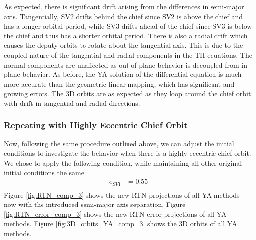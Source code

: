 As expected, there is significant drift arising from the differences in semi-major axis. Tangentially, SV2 drifts behind the chief since SV2 is above the chief and has a longer orbital period, while SV3 drifts ahead of the chief since SV3 is below the chief and thus has a shorter orbital period. There is also a radial drift which causes the deputy orbits to rotate about the tangential axis. This is due to the coupled nature of the tangential and radial components in the TH equations. The normal components are unaffected as out-of-plane behavior is decoupled from in-plane behavior. As before, the YA solution of the differential equation is much more accurate than the geometric linear mapping, which has significant and growing errors. The 3D orbits are as expected as they loop around the chief orbit with drift in tangential and radial directions.

\subsubsection{Repeating with Highly Eccentric Chief Orbit}
Now, following the same procedure outlined above, we can adjust the initial conditions to investigate the behavior when there is a highly eccentric chief orbit. We chose to apply the following condition, while maintaining all other original initial conditions the same. 
\begin{align*}
e_{SV1} &= 0.55 \\
\end{align*}
Figure \ref{fig:RTN_comp_3} shows the new RTN projections of all YA methods now with the introduced semi-major axis separation. Figure \ref{fig:RTN_error_comp_3} shows the new RTN error projections of all YA methods. Figure \ref{fig:3D_orbits_YA_comp_3} shows the 3D orbits of all YA methods. 

